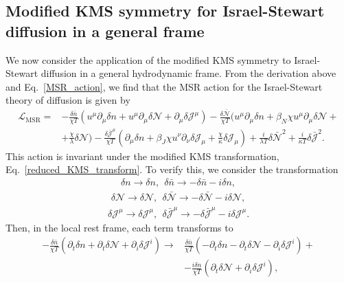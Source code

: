 \documentclass[aps,prd,nofootinbib,amsmath,amssymb,showpacs,longbibliography,singlecolumn,superscriptaddress,notitlepage]{revtex4-1}
\theoremstyle{plain}
\theoremstyle{definition}
\begin{document}
\subsection{Modified KMS symmetry for Israel-Stewart diffusion in a general frame}
\label{Sec:KMS_U1_thermo_stable}

We now consider the application of the modified KMS symmetry to Israel-Stewart diffusion in a general hydrodynamic frame. From the derivation above and Eq.\ \eqref{MSR_action}, we find that the MSR action for the Israel-Stewart theory of diffusion is given by 
\begin{equation}
\begin{split}
    \mathcal{L}_{\mathrm{MSR}} = & - \frac{\delta \bar{n}}{\chi T} \left( u^{\mu} \partial_{\mu} \delta n + u^{\mu} \partial_{\mu} \delta \mathcal{N} + \partial_{\mu} \delta \mathcal{J}^{\mu} \right) - \frac{\delta \bar{\mathcal{N}}}{\chi T} \bigg( u^{\mu} \partial_{\mu} \delta n + \beta_N \chi u^{\mu} \partial_{\mu} \delta \mathcal{N} + \\
    & + \frac{\chi}{\lambda} \delta \mathcal{N} \bigg) - \frac{\delta \bar{\mathcal{J}}^{\mu}}{\chi T} \left( \partial_{\mu} \delta n + \beta_J \chi u^{\nu} \partial_{\nu} \delta \mathcal{J}_{\mu} + \frac{\chi}{\kappa} \delta \mathcal{J}_{\mu} \right) + \frac{i}{\lambda T} \delta \bar{\mathcal{N}}^2 + \frac{i}{\kappa T} \delta \bar{\mathcal{J}}^2 .
\end{split}
\end{equation}
This action is invariant under the modified KMS transformation, Eq.\ \eqref{reduced_KMS_transform}. To verify this, we consider the transformation
\begin{eqnarray}
    \delta n \rightarrow \delta n , \:\: \delta \bar{n} \rightarrow - \delta \bar{n} - i \delta n ,
\end{eqnarray}
\begin{eqnarray}
    \delta \mathcal{N} \rightarrow \delta \mathcal{N} , \:\: \delta \bar{\mathcal{N}} \rightarrow - \delta \bar{\mathcal{N}} - i \delta \mathcal{N} ,
\end{eqnarray}
\begin{eqnarray}
    \delta \mathcal{J}^{\mu} \rightarrow \delta \mathcal{J}^{\mu} , \:\: \delta \bar{\mathcal{J}}^{\mu} \rightarrow - \delta \bar{\mathcal{J}}^{\mu} - i \delta \mathcal{J}^{\mu} .
\end{eqnarray}
Then, in the local rest frame, each term transforms to 
\begin{equation}
\begin{split}
    - \frac{\delta \bar{n}}{\chi T} \left( \partial_t \delta n + \partial_t \delta \mathcal{N} + \partial_i \delta \mathcal{J}^i \right) \rightarrow & \frac{\delta \bar{n}}{\chi T} \left( -\partial_t \delta n - \partial_t \delta \mathcal{N} - \partial_i \delta \mathcal{J}^i \right) + \\
    & - \frac{i \delta n}{\chi T} \left( \partial_t \delta \mathcal{N} + \partial_i \delta \mathcal{J}^i \right) ,
\end{split}
\end{equation}
\end{document}
